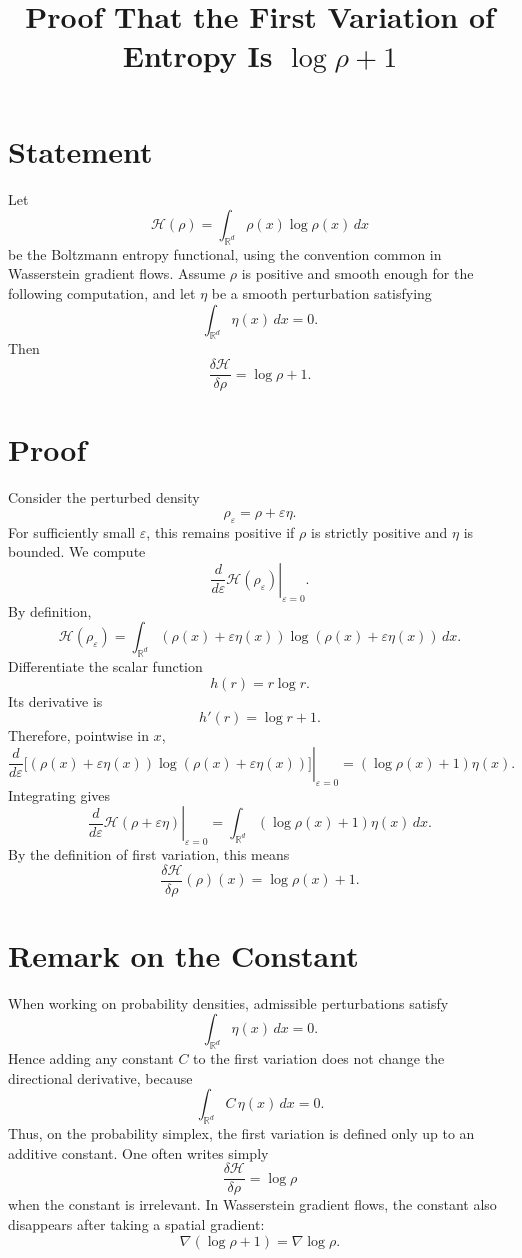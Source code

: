 \documentclass[11pt]{article}
\title{Proof That the First Variation of Entropy Is $\log\rho+1$}
\author{}
\date{}
\begin{document}
\maketitle

\section*{Statement}

Let
\[
\mathcal H(\rho)
=
\int_{\mathbb R^d}\rho(x)\log\rho(x)\,dx
\]
be the Boltzmann entropy functional, using the convention common in
Wasserstein gradient flows.
Assume $\rho$ is positive and smooth enough for the following computation, and
let $\eta$ be a smooth perturbation satisfying
\[
\int_{\mathbb R^d}\eta(x)\,dx=0.
\]
Then
\[
\frac{\delta \mathcal H}{\delta \rho}
=
\log\rho+1.
\]

\section*{Proof}

Consider the perturbed density
\[
\rho_\varepsilon=\rho+\varepsilon\eta.
\]
For sufficiently small $\varepsilon$, this remains positive if $\rho$ is
strictly positive and $\eta$ is bounded. We compute
\[
\left.
\frac{d}{d\varepsilon}
\mathcal H(\rho_\varepsilon)
\right|_{\varepsilon=0}.
\]
By definition,
\[
\mathcal H(\rho_\varepsilon)
=
\int_{\mathbb R^d}
(\rho(x)+\varepsilon\eta(x))
\log(\rho(x)+\varepsilon\eta(x))\,dx.
\]
Differentiate the scalar function
\[
h(r)=r\log r.
\]
Its derivative is
\[
h'(r)=\log r+1.
\]
Therefore, pointwise in $x$,
\[
\left.
\frac{d}{d\varepsilon}
\Big[
(\rho(x)+\varepsilon\eta(x))
\log(\rho(x)+\varepsilon\eta(x))
\Big]
\right|_{\varepsilon=0}
=
(\log\rho(x)+1)\eta(x).
\]
Integrating gives
\[
\left.
\frac{d}{d\varepsilon}
\mathcal H(\rho+\varepsilon\eta)
\right|_{\varepsilon=0}
=
\int_{\mathbb R^d}
(\log\rho(x)+1)\eta(x)\,dx.
\]
By the definition of first variation, this means
\[
\frac{\delta \mathcal H}{\delta \rho}(\rho)(x)
=
\log\rho(x)+1.
\]

\section*{Remark on the Constant}

When working on probability densities, admissible perturbations satisfy
\[
\int_{\mathbb R^d}\eta(x)\,dx=0.
\]
Hence adding any constant $C$ to the first variation does not change the
directional derivative, because
\[
\int_{\mathbb R^d}C\,\eta(x)\,dx=0.
\]
Thus, on the probability simplex, the first variation is defined only up to an
additive constant. One often writes simply
\[
\frac{\delta \mathcal H}{\delta\rho}=\log\rho
\]
when the constant is irrelevant. In Wasserstein gradient flows, the constant
also disappears after taking a spatial gradient:
\[
\nabla(\log\rho+1)=\nabla\log\rho.
\]
\end{document}
